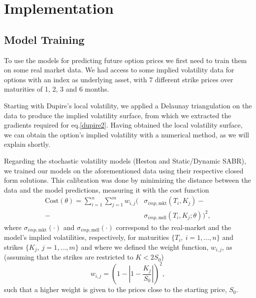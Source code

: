 
\section{Implementation}
\label{sec:imple}
\subsection{Model Training}
To use the models for predicting future option prices we first need to train them on some real market data. We had access to some implied volatility data for options with an index as underlying asset, with 7 different strike prices over maturities of 1, 2, 3 and 6 months.

Starting with Dupire's local volatility, we applied a Delaunay triangulation on the data to produce the implied volatility surface, from which we extracted the gradients required for eq.\eqref{dupire2}. Having obtained the local volatility surface, we can obtain the option's implied volatility with a numerical method, as we will explain shortly.

Regarding the stochastic volatility models (Heston and Static/Dynamic SABR), we trained our models on the aforementioned data using their respective closed form solutions. This calibration was done by minimizing the distance between the data and the model predictions, measuring it with the cost function
\begin{equation}\label{cost}
\begin{split}
\mathrm{Cost}(\theta)=\sum_{i=1}^n\sum_{j=1}^mw_{i,j}(&\sigma_{imp,\mathrm{mkt}}(T_i,K_j)-\\
-&\sigma_{imp,\mathrm{mdl}}(T_i,K_j;\theta))^2,
\end{split}
\end{equation}
\noindent where $\sigma_{imp,\mathrm{mkt}}(\cdot)$ and $\sigma_{imp,\mathrm{mdl}}(\cdot)$ correspond to the real-market and the model's implied volatilities, respectively, for maturities $\{T_i,\ i=1,\ldots,n\}$ and strikes $\{K_j,\ j=1,\ldots,m\}$ and where we defined the weight function, $w_{i,j}$, as (assuming that the strikes are restricted to $K<2S_0$)
\begin{equation}\label{weight}
w_{i,j}=\left(1-\left|1-\frac{K_j}{S_0}\right|\right)^2,
\end{equation}
\noindent such that a higher weight is given to the prices close to the starting price, $S_0$.

